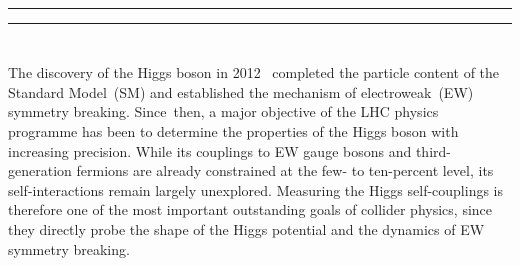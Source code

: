 \documentclass{SciPost}
\begin{document}
\vspace{\baselineskip}

\noindent\textcolor{white!90!black}{%
}




\newpage

\vspace{10pt}
\noindent\rule{\textwidth}{1pt}
\tableofcontents
\noindent\rule{\textwidth}{1pt}
\vspace{10pt}

\allowdisplaybreaks

\section{\textbf{}}
\label{sec:introduction}

The discovery of the Higgs boson in 2012~\cite{ATLAS:2012yve,CMS:2012qbp} completed the particle content of the Standard Model~(SM) and established the mechanism of electroweak~(EW) symmetry breaking. Since~then, a major objective of the LHC physics programme has been to determine the properties of the Higgs boson with increasing precision. While its couplings to EW gauge bosons and third-generation fermions are already constrained at the few- to ten-percent level, its self-interactions remain largely unexplored. Measuring the Higgs self-couplings is therefore one of the most important outstanding goals of collider physics, since they directly probe the shape of the Higgs potential and the dynamics of EW symmetry breaking.
\end{document}
